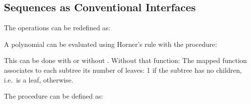 \subsection{Sequences as Conventional Interfaces}

\begin{exe}[2.33]
    The operations can be redefined as:
\end{exe}

\begin{exe}[2.34]
    A polynomial can be evaluated using Horner’s rule with the procedure:
\end{exe}

\begin{exe}[2.35]
    This can be done with or without . Without that function:
    The mapped function associates to each subtree its number of leaves: 1 if 
    the subtree has no children, i.e.\ is a leaf,  
    otherwise.
\end{exe}

\begin{exe}[2.36]
    The procedure  can be defined as:
\end{exe}
